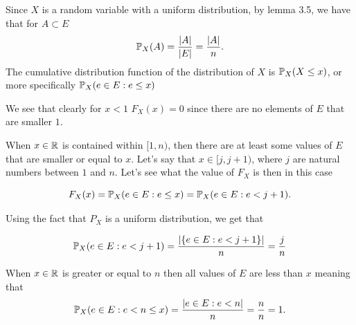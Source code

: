 
Since $ X$ is a random variable with a uniform distribution, by lemma 3.5, we have that 
for $ A \subset E$
\[
    \P_{X} (A) = \frac{|A|}{|E|} = \frac{|A|}{n} 
.\] 
The cumulative distribution function of the distribution of $ X$ is $\P_{X} (X \leq x)$, or more
specifically $ \P_{X} (e \in E: e \leq x)$
 
We see that clearly for $ x< 1$ $ F_{X}(x) = 0 $ since there are no elements of $ E$ that are
smaller
$ 1$. 

When $ x \in \R	$ is contained within $ [1,n)$, then there are at least some values of $ E$ that are 
smaller or equal to $ x$. Let's say that $ x \in [j, j+1)$, where $ j$ are natural numbers between
$ 1$ and $ n$. Let's see what the value of $ F_{X} $ is then in this case

\[
    F_{X} (x) = \P_{X} (e \in E : e \leq x) = \P_{X} (e \in E: e < j+1)  
.\] 

Using the fact that $ P_{X} $ is a uniform distribution, we get that 

\begin{align*}
    \P_{X} (e \in E: e < j+1) = \frac{| \{ e \in E: e < j+1 \} |}{n} = \frac{j}{n}  
\end{align*}

When $ x \in \R$ is greater or equal to $ n$ then all values of $ E$ are less than $ x$ meaning that 
\[
    \P_{X} (e \in E: e < n \leq x) = \frac{|e \in E: e < n|}{n} = \frac{n}{n} = 1
.\] 
